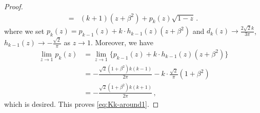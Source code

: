 \documentclass[11pt]{article}
\begin{document}
\begin{proof}
\begin{align*}
={}& (k+1)(z+\beta^2) + p_k(z)\sqrt{1-z}\,.
\end{align*}
where we set $p_k(z)=p_{k-1}(z) + k \cdot h_{k-1}(z)(z+\beta^2)$ and $d_k(z)\to \frac{2\sqrt{2}k}{3\pi}$, $h_{k-1}(z)\to -\frac{\sqrt{2}}{\pi}$ as $z\to 1$. Moreover, we have 
\begin{align*}
    \lim_{z\to 1}p_k(z)&=\lim_{z\to 1}\Big\{ p_{k-1}(z) + k \cdot h_{k-1}(z)(z+\beta^2)\Big\}\\
    &=-\frac{\sqrt{2}(1+\beta^2)k(k-1)}{2\pi}-k\cdot\frac{\sqrt{2}}{\pi}(1+\beta^2)\\
    &=-\frac{\sqrt{2}(1+\beta^2)k(k+1)}{2\pi}\,,
\end{align*}
which is desired. This proves \eqref{eq:Kk-around1}.






\end{proof}
\end{document}
